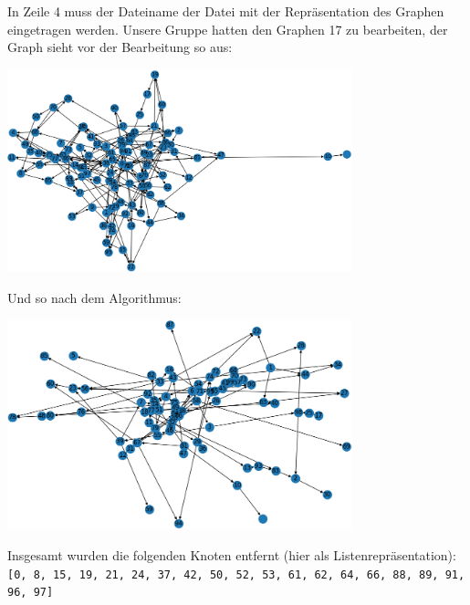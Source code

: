 \documentclass{article}
\begin{document}
	In Zeile 4 muss der Dateiname der Datei mit der Repräsentation des Graphen eingetragen werden. Unsere Gruppe hatten den Graphen 17 zu bearbeiten, der Graph sieht vor der Bearbeitung so aus:
	\begin{center}
		\includegraphics[width=0.75\textwidth]{./vorher}
	\end{center}
	Und so nach dem Algorithmus:
	\begin{center}
		\includegraphics[width=0.75\textwidth]{./nachher}
	\end{center}
	Insgesamt wurden die folgenden Knoten entfernt (hier als Listenrepräsentation): \texttt{[0, 8, 15, 19, 21, 24, 37, 42, 50, 52, 53, 61, 62, 64, 66, 88, 89, 91, 96, 97]}
	
\end{document}
